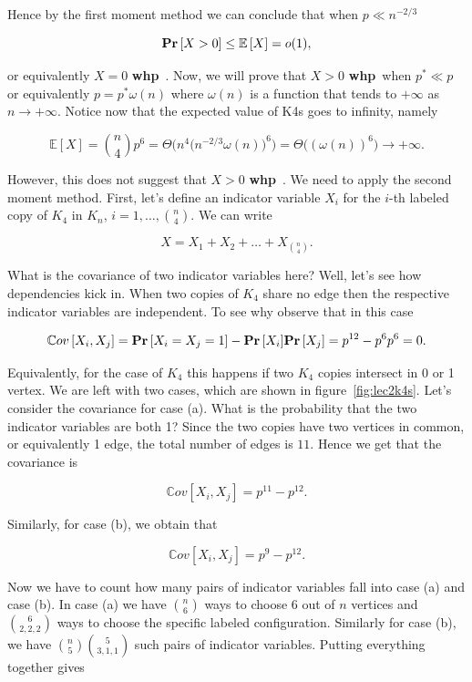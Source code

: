 \documentclass[twoside]{article}
\newcommand{\whp}{{\bf whp}\ }
\newcommand{\Prob}[1]{{{\bf{Pr}}\left[{#1}\right]}}
\newcommand{\Mean}[1]{{\mathbb E}\left[{#1}\right]}
\newcommand{\Cov}[1]{{\mathbb Cov}\left[{#1}\right]}
\begin{document}
Hence by the first moment method we can conclude that when $p \ll n^{-2/3}$ 

$$ \Prob{X>0} \leq \Mean{X} = o(1),$$ 

\noindent or equivalently $X=0$ \whp. 
Now, we will prove that $X>0$ \whp when $p^* \ll p$ or equivalently $p=p^*\omega(n)$ where 
$\omega(n)$ is a function that tends to $+\infty$ as $n \rightarrow +\infty$. 
Notice now that the expected value of K4s goes to infinity, namely 

$$ \Mean{X} = {n \choose 4} p^6 = \Theta\Bigg(n^4 \big( n^{-2/3}\omega(n)\big)^6\Bigg) = \Theta\Bigg( (\omega(n))^6\Bigg) \rightarrow +\infty.$$


\noindent However, this does not suggest that $X>0$ \whp. We need to apply the second moment method. 
First, let's define an indicator variable $X_i$ for the $i$-th labeled copy of $K_4$ in $K_n$, 
$i=1,\ldots,{n \choose 4}$. We can write

$$ X = X_1 + X_2 + \ldots + X_{{n \choose 4}}.$$ 

What is the covariance of two indicator variables here? Well, let's see how dependencies
kick in. When two copies of $K_4$ share no edge then the respective indicator variables 
are independent. To see why observe that  in this case 

 
$$ \Cov{X_i, X_j} = \Prob{X_i=X_j=1} - \Prob{X_i}\Prob{X_j} = p^{12}-p^6p^6=0.$$

Equivalently, for the case of $K_4$ this happens if two $K_4$ copies intersect in 0 or 1 vertex. 
We are left with two cases, which are shown in figure~\ref{fig:lec2k4s}. 
Let's consider the covariance for case (a). 
What is the probability that the two indicator variables are both 1? 
Since the two copies have two vertices in common, or equivalently 1 edge, 
the total number of edges is $11$. Hence we get that the covariance is 

$$ \Cov{X_i,X_j} = p^{11}-p^{12}.$$ 

\noindent Similarly, for case (b), we obtain that 

$$ \Cov{X_i,X_j} = p^9-p^{12}.$$ 

Now we have to count how many pairs of indicator variables fall into case (a)
and case (b). In case (a) we have ${n \choose 6}$ ways to choose 6  
out of $n$ vertices and ${6 \choose 2,2,2}$ ways to choose the specific 
labeled configuration. Similarly for case (b), we have ${n \choose 5}  {5 \choose 3,1,1}$
such pairs of indicator variables. Putting everything together gives
\end{document}
